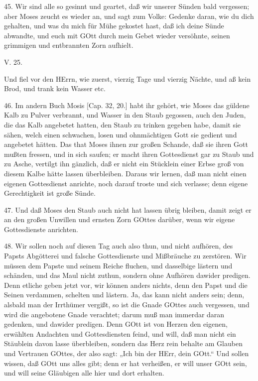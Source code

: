 45. Wir sind alle so gesinnt und geartet, daß wir unserer Sünden bald vergessen; aber Moses zeucht es wieder an, und sagt zum Volke: Gedenke daran, wie du dich gehalten, und was du mich für Mühe gekostet hast, daß ich deine Sünde abwandte, und euch mit GOtt durch mein Gebet wieder versöhnte, seinen grimmigen und entbrannten Zorn aufhielt.

\begin{schriftzitat}
V. 25.
\end{schriftzitat}

Und fiel vor den HErrn, wie zuerst, vierzig Tage und vierzig Nächte, und aß kein Brod, und trank kein Wasser etc.

46. Im andern Buch Mosis [Cap. 32, 20.] habt ihr gehört, wie Moses das güldene Kalb zu Pulver verbrannt, und Wasser in den Staub gegossen, auch den Juden, die das Kalb angebetet hatten, den Staub zu trinken gegeben habe, damit sie sähen, welch einen schwachen, losen und ohnmächtigen Gott sie gedient und angebetet hätten. Das that Moses ihnen zur großen Schande, daß sie ihren Gott mußten fressen, und in sich saufen; er macht ihren Gottesdienst gar zu Staub und zu Asche, vertilgt ihn gänzlich, daß er nicht ein Stücklein einer Erbse groß von diesem Kalbe hätte lassen überbleiben. Daraus wir lernen, daß man nicht einen eigenen Gottesdienst anrichte, noch darauf troste und sich verlasse; denn eigene Gerechtigkeit ist große Sünde.

47. Und daß Moses den Staub auch nicht hat lassen übrig bleiben, damit zeigt er an den großen Unwillen und ernsten Zorn GOttes darüber, wenn wir eigene Gottesdienste anrichten.

48. Wir sollen noch auf diesen Tag auch also thun, und nicht aufhören, des Papsts Abgötterei und falsche Gottesdienste und Mißbräuche zu zerstören. Wir müssen dem Papste und seinem Reiche fluchen, und dasselbige lästern und schänden, und das Maul nicht zuthun, sondern ohne Aufhören dawider predigen. Denn etliche geben jetzt vor, wir können anders nichts, denn den Papst und die Seinen verdammen, schelten und lästern. Ja, das kann nicht anders sein; denn, alsbald man der Irrthümer vergißt, so ist die Gnade GOttes auch vergessen, und wird die angebotene Gnade verachtet; darum muß man immerdar daran gedenken, und dawider predigen. Denn GOtt ist von Herzen den eigenen, erwählten Andachten und Gottesdiensten feind, und will, daß man nicht ein Stäublein davon lasse überbleiben, sondern das Herz rein behalte am Glauben und Vertrauen GOttes, der also sagt: „Ich bin der HErr, dein GOtt.“ Und sollen wissen, daß GOtt uns alles gibt; denn er hat verheißen, er will unser GOtt sein, und will seine Gläubigen alle hier und dort erhalten.

